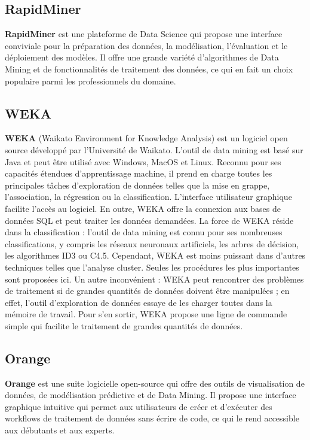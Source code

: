\documentclass[a4paper,12pt]{article}
\begin{document}
    \subsection{RapidMiner}
    \textbf{RapidMiner} est une plateforme de Data Science qui propose une interface conviviale pour la préparation des données, la modélisation, l’évaluation et le déploiement des modèles. Il offre une grande variété d’algorithmes de Data Mining et de fonctionnalités de traitement des données, ce qui en fait un choix populaire parmi les professionnels du domaine.

    
    \subsection{WEKA}
    \textbf{WEKA} (Waikato Environment for Knowledge Analysis) est un logiciel open source développé par l'Université de Waikato. L'outil de data mining est basé sur Java et peut être utilisé avec Windows, MacOS et Linux. Reconnu pour ses capacités étendues d'apprentissage machine, il prend en charge toutes les principales tâches d'exploration de données telles que la mise en grappe, l'association, la régression ou la classification. L'interface utilisateur graphique facilite l'accès au logiciel. En outre, WEKA offre la connexion aux bases de données SQL et peut traiter les données demandées. La force de WEKA réside dans la classification : l'outil de data mining est connu pour ses nombreuses classifications, y compris les réseaux neuronaux artificiels, les arbres de décision, les algorithmes ID3 ou C4.5. Cependant, WEKA est moins puissant dans d'autres techniques telles que l'analyse cluster. Seules les procédures les plus importantes sont proposées ici. Un autre inconvénient : WEKA peut rencontrer des problèmes de traitement si de grandes quantités de données doivent être manipulées ; en effet, l'outil d'exploration de données essaye de les charger toutes dans la mémoire de travail. Pour s'en sortir, WEKA propose une ligne de commande simple qui facilite le traitement de grandes quantités de données. 

    
    \subsection{Orange}
    \textbf{Orange} est une suite logicielle open-source qui offre des outils de visualisation de données, de modélisation prédictive et de Data Mining. Il propose une interface graphique intuitive qui permet aux utilisateurs de créer et d’exécuter des workflows de traitement de données sans écrire de code, ce qui le rend accessible aux débutants et aux experts.
\end{document}
